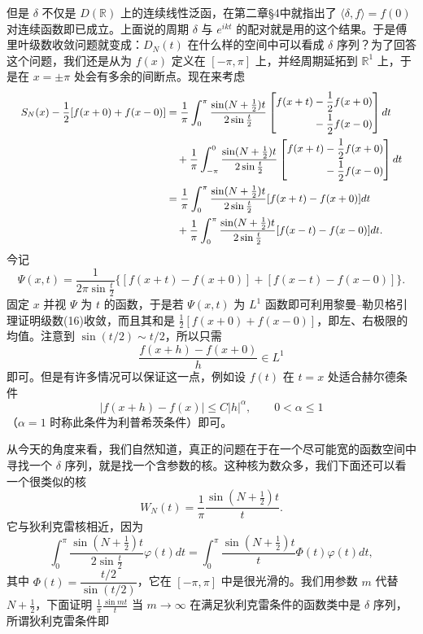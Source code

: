 但是 $\delta$ 不仅是 $D(\mathbb R)$ 上的连续线性泛函，在第二章\S4中就指出了 $\langle\delta,f\rangle=f(0)$ 对连续函数即已成立。上面说的周期 $\delta$ 与 $e^{ikt}$ 的配对就是用的这个结果。于是傅里叶级数收敛问题就变成：$D_N(t)$ 在什么样的空间中可以看成 $\delta$ 序列？为了回答这个问题，我们还是从为 $f(x)$ 定义在 $[-\pi,\pi]$ 上，并经周期延拓到 $\mathbb R^1$ 上，于是在 $x=\pm\pi$ 处会有多余的间断点。现在来考虑
\[
 {\small
 \begin{aligned}
 S_N(x)-\frac12[f(x+0)+f(x-0)]
 &=\frac1\pi\int_0^{\pi}\frac{\sin(N+\frac12)t}{2\sin\frac t2}
 \left[\begin{aligned}f(x+t)&-\frac12f(x+0)\\[-2pt]&-\frac12f(x-0)\end{aligned}\right]dt\\
 &\quad+\frac1\pi\int_{-\pi}^{0}\frac{\sin(N+\frac12)t}{2\sin\frac t2}
 \left[\begin{aligned}f(x+t)&-\frac12f(x+0)\\[-2pt]&-\frac12f(x-0)\end{aligned}\right]dt\\
 &=\frac1\pi\int_0^{\pi}\frac{\sin(N+\frac12)t}{2\sin\frac t2}[f(x+t)-f(x+0)]dt\\
 &\quad+\frac1\pi\int_0^{\pi}\frac{\sin(N+\frac12)t}{2\sin\frac t2}[f(x-t)-f(x-0)]dt.
 \end{aligned}
 }
\]
今记
\[
 \Psi(x,t)=\frac1{2\pi\sin\frac t2}
 \{[f(x+t)-f(x+0)]+[f(x-t)-f(x-0)]\}.
\]
固定 $x$ 并视 $\Psi$ 为 $t$ 的函数，于是若 $\Psi(x,t)$ 为 $L^1$ 函数即可利用黎曼--勒贝格引理证明级数(16)收敛，而且其和是 $\frac12[f(x+0)+f(x-0)]$，即左、右极限的均值。注意到 $\sin(t/2)\sim t/2$，所以只需
\[
 \frac{f(x+h)-f(x+0)}{h}\in L^1
\]
即可。但是有许多情况可以保证这一点，例如设 $f(t)$ 在 $t=x$ 处适合赫尔德条件
\[
 |f(x+h)-f(x)|\le C|h|^\alpha,\qquad 0<\alpha\le1
\]
（$\alpha=1$ 时称此条件为利普希茨条件）即可。

从今天的角度来看，我们自然知道，真正的问题在于在一个尽可能宽的函数空间中寻找一个 $\delta$ 序列，就是找一个含参数的核。这种核为数众多，我们下面还可以看一个很类似的核
\begin{equation}
 W_N(t)=\frac1\pi\frac{\sin(N+\frac12)t}{t}.
 \tag{27}
\end{equation}
它与狄利克雷核相近，因为
\[
 \int_0^{\pi}\frac{\sin(N+\frac12)t}{2\sin\frac t2}\varphi(t)dt
 =\int_0^{\pi}\frac{\sin(N+\frac12)t}{t}\Phi(t)\varphi(t)dt,
\]
其中 $\Phi(t)=\dfrac{t/2}{\sin(t/2)}$，它在 $[-\pi,\pi]$ 中是很光滑的。我们用参数 $m$ 代替 $N+\frac12$，下面证明 $\frac1\pi\frac{\sin mt}{t}$ 当 $m\to\infty$ 在满足狄利克雷条件的函数类中是 $\delta$ 序列，所谓狄利克雷条件即

